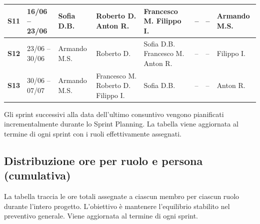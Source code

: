 \begin{longtable}{|cp{1.7cm}|p{1.7cm}|p{1.7cm}|p{1.7cm}|p{1.7cm}|p{1.7cm}|p{1.7cm}|}
    \hline
    \textbf{S11} & 16/06 -- 23/06 & Sofia D.B. & Roberto D. \newline Anton R. & Francesco M. \newline  Filippo I. & -- & -- & Armando M.S. \\
    \hline
    \textbf{S12} & 23/06 -- 30/06 & Armando M.S. & Roberto D. & Sofia D.B. \newline Francesco M. \newline Anton R. & -- & -- & Filippo I. \\
    \hline
    \textbf{S13} & 30/06 -- 07/07 & Armando M.S. & Francesco M. \newline Roberto D. \newline Filippo I. & Sofia D.B. & -- & -- & Anton R. \\
\end{longtable}

Gli sprint successivi alla data dell'ultimo consuntivo vengono pianificati
incrementalmente durante lo Sprint Planning. La tabella viene aggiornata al
termine di ogni sprint con i ruoli effettivamente assegnati.

\subsection{Distribuzione ore per ruolo e persona (cumulativa)}
La tabella traccia le ore totali assegnate a ciascun membro per ciascun ruolo durante
l'intero progetto. L'obiettivo è mantenere l'equilibrio stabilito nel preventivo
generale. Viene aggiornata al termine di ogni sprint.

